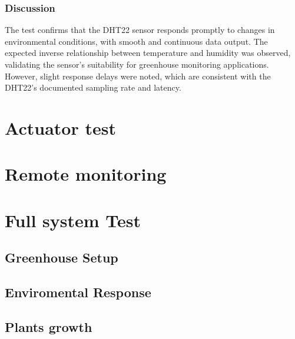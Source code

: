 \subsubsection*{Discussion}
The test confirms that the DHT22 sensor responds promptly to changes in environmental conditions, with smooth and continuous data output. 
The expected inverse relationship between temperature and humidity was observed, validating the sensor’s suitability for greenhouse monitoring applications. 
However, slight response delays were noted, which are consistent with the DHT22's documented sampling rate and latency.


\section{Actuator test }

\section{Remote monitoring}

\section{Full system Test}

\subsection{Greenhouse Setup}

\subsection{Enviromental Response}

\subsection{Plants growth}

